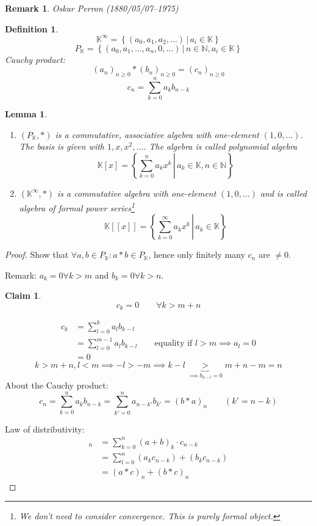 \documentclass{article}
\newtheorem{definition}{Definition}  \numberwithin{definition}{section}
\newtheorem{lemma}{Lemma}  \numberwithin{lemma}{section}
\newtheorem*{claim}{Claim}%
\newtheorem{remark}{Remark}  \numberwithin{remark}{section}
\newcommand{\setdef}[2]{\left\{\left.#1\,\right|\,#2\right\}}
\begin{document}
\begin{remark}
  Oskar Perron (1880/05/07--1975)
\end{remark}

\begin{definition} %
  \[ \mathbb K^\infty = \setdef{(a_0, a_1, a_2, \dots)}{a_i \in \mathbb K} \]
  \[ P_{\mathbb K} = \setdef{(a_0, a_1, \dots, a_n, 0, \dots)}{n \in \mathbb N, a_i \in \mathbb K} \]
  Cauchy product:
  \[ (a_n)_{n \geq 0} * (b_n)_{n \geq 0} = (c_n)_{n \geq 0} \]
  \[ c_n = \sum_{k=0}^n a_k b_{n-k} \]
\end{definition}

\begin{lemma} %
  \begin{enumerate}
    \item $(P_{\mathbb K}, *)$ is a commutative, associative algebra with one-element $(1, 0, \dots)$.
      The basis is given with $1, x, x^2, \dots$. The algebra is called \emph{polynomial algebra}
      \[ \mathbb K[x] = \setdef{\sum_{k=0}^n a_k x^k}{a_k \in \mathbb K, n \in \mathbb N} \]
    \item $(\mathbb K^\infty, *)$ is a commutative algebra with one-element $(1, 0, \dots)$
      and is called \emph{algebra of formal power series}\footnote{We don't need to consider convergence. This is purely formal object.}
      \[ \mathbb K[[x]] = \setdef{\sum_{k=0}^\infty a_k x^k}{a_k \in \mathbb K} \]
  \end{enumerate}
\end{lemma}

\begin{proof}
  Show that $\forall a,b \in P_{\mathbb K}: a * b \in P_{\mathbb K}$, hence only finitely many $c_n$ are $\neq 0$.

  Remark: $a_k = 0 \forall k > m$ and $b_k = 0 \forall k > n$.

  \begin{claim}
    \[ c_k = 0 \qquad \forall k > m + n \]
  \end{claim}

  \begin{align*}
    c_k &= \sum_{l=0}^k a_l b_{k-l} \\
      &= \sum_{l=0}^{m-1} a_l b_{k-l} \qquad \text{equality if $l > m \implies a_l = 0$} \\
      &= 0
  \end{align*}
  \[ k > m + n, l < m \implies -l > -m \implies k - l \underbrace{>}_{\implies b_{k-l} = 0} m + n - m = n \]
  About the Cauchy product:
  \[ c_n = \sum_{k=0}^n a_k b_{n-k} = \sum_{k'=0}^n a_{n-k'} b_{k'} = (b * a)_n \qquad (k' = n - k) \]

  Law of distributivity:
  \begin{align*}
    [(a + b) * c]_n &= \sum_{k=0}^n (a + b)_k \cdot c_{n-k} \\
      &= \sum_{l=0}^n (a_k c_{n-k}) + (b_k c_{n-k}) \\
      &= (a * c)_n + (b * c)_n
  \end{align*}
\end{proof}
\end{document}
